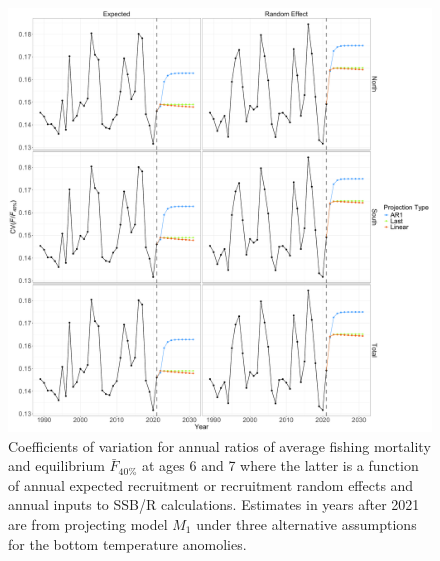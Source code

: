 \documentclass[
]{article}
\begin{document}
\begin{figure}

{\centering \includegraphics[height=0.95\textheight]{proj_F_status_CV} 

}

\caption{Coefficients of variation for annual ratios of average fishing mortality and equilibrium $\bar{F}_{40\%}$ at ages 6 and 7 where the latter is a function of annual expected recruitment or recruitment random effects and annual inputs to SSB/R calculations. Estimates in years after 2021 are from projecting model $M_1$ under three alternative assumptions for the bottom temperature anomolies.}\label{fig:annual-F-status-cvs}
\end{figure}
\end{document}
